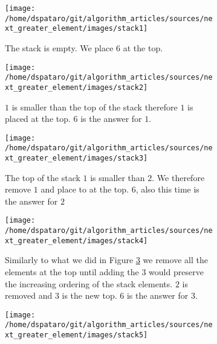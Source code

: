  \begin{figure}
	\vspace*{-0.5in}
	\centering
	\begin{subfigure}[t]{0.49\textwidth}
		\begin{framed}
			\texttt{[image: /home/dspataro/git/algorithm\_articles/sources/next\_greater\_element/images/stack1]}
		\end{framed}
		\caption{The stack is empty. We place $6$ at the top.}
		\label{fig:next_greater:variation1:stack1}
	 \end{subfigure}
	\hfill
	\begin{subfigure}[t]{0.49\textwidth}
		\begin{framed}
			\texttt{[image: /home/dspataro/git/algorithm\_articles/sources/next\_greater\_element/images/stack2]}
		\end{framed}
		\caption{$1$ is smaller than the top of the stack therefore $1$ is placed at the top. $6$ is the answer for $1$.}
		\label{fig:next_greater:variation1:stack2}
	 \end{subfigure}
	 \hfill
	 \begin{subfigure}[t]{0.49\textwidth}
		\begin{framed}
			\texttt{[image: /home/dspataro/git/algorithm\_articles/sources/next\_greater\_element/images/stack3]}
		\end{framed}
		\caption{The top of the stack $1$ is smaller than $2$. We therefore remove $1$ and place to at the top. $6$, also this time is the answer for $2$}
		\label{fig:next_greater:variation1:stack3}
	 \end{subfigure}
	 \hfill
	 \begin{subfigure}[t]{0.49\textwidth}
		\begin{framed}
			\texttt{[image: /home/dspataro/git/algorithm\_articles/sources/next\_greater\_element/images/stack4]}
		\end{framed}
		\caption{Similarly to what we did in Figure \ref{fig:next_greater:variation1:stack3} we remove all the elements at the top until adding the $3$ would preserve the increasing ordering of the stack elements. $2$ is removed and $3$ is the new top. $6$ is the answer for $3$.}
		\label{fig:next_greater:variation1:stack1}
	 \end{subfigure}
	 \hfill
	 \begin{subfigure}[t]{0.49\textwidth}
		\begin{framed}
			\texttt{[image: /home/dspataro/git/algorithm\_articles/sources/next\_greater\_element/images/stack5]}

\end{framed}
\end{subfigure}
\end{figure}
